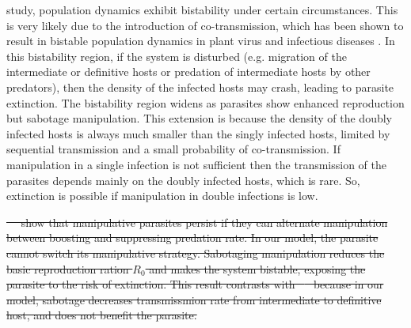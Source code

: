 \documentclass[a4paper]{scrartcl}
\providecommand{\DIFaddtex}[1]{{\protect\color{blue}\uwave{#1}}} %
\providecommand{\DIFdeltex}[1]{{\protect\color{red}\sout{#1}}}                      %
\providecommand{\DIFaddend}{} %
\providecommand{\DIFdelbegin}{} %
\providecommand{\DIFadd}[1]{\texorpdfstring{\DIFaddtex{#1}}{#1}} %
\providecommand{\DIFdel}[1]{\texorpdfstring{\DIFdeltex{#1}}{}} %
\newcommand{\DIFscaledelfig}{0.5}
\newlength{\DIFdelgraphicswidth} %
\newlength{\DIFdelgraphicsheight} %
\newcommand{\DIFdelincludegraphics}[2][]{%
\sbox{\DIFdelgraphicsbox}{\DIFOincludegraphics[#1]{#2}}%
\settoboxwidth{\DIFdelgraphicswidth}{\DIFdelgraphicsbox} %
\settoboxtotalheight{\DIFdelgraphicsheight}{\DIFdelgraphicsbox} %
\scalebox{\DIFscaledelfig}{%
\parbox[b]{\DIFdelgraphicswidth}{\usebox{\DIFdelgraphicsbox}\\[-\baselineskip] \rule{\DIFdelgraphicswidth}{0em}}\llap{\resizebox{\DIFdelgraphicswidth}{\DIFdelgraphicsheight}{%
\setlength{\unitlength}{\DIFdelgraphicswidth}%
\begin{picture}(1,1)%
\thicklines\linethickness{2pt} %
{\color[rgb]{1,0,0}\put(0,0){\framebox(1,1){}}}%
{\color[rgb]{1,0,0}\put(0,0){\line( 1,1){1}}}%
{\color[rgb]{1,0,0}\put(0,1){\line(1,-1){1}}}%
\end{picture}%
}\hspace*{3pt}}} %
} %
\DeclareRobustCommand{\DIFaddend}{\DIFOaddend \let\includegraphics\DIFOincludegraphics} %
\DeclareRobustCommand{\DIFdelbegin}{\DIFOdelbegin \let\includegraphics\DIFdelincludegraphics} %
\begin{document}
\DIFadd{In our }\DIFaddend study, population dynamics exhibit bistability under certain circumstances. 
This is very likely due to the introduction of co-transmission, which has been shown to result in bistable population dynamics in plant virus \cite{allen_modelling_2019} and infectious diseases \cite{gao_coinfection_2016-1}.
 In this bistability region, if the system is disturbed (e.g. migration of the intermediate or definitive hosts or predation of intermediate hosts by other predators), then the density of the infected hosts may crash, leading to parasite extinction. 
The bistability region widens as parasites show enhanced reproduction but sabotage manipulation. 
This extension is because the density of the doubly infected hosts is always much smaller than the singly infected hosts, limited by sequential transmission and a small probability of co-transmission. 
If manipulation in a single infection is not sufficient then the transmission of the parasites depends mainly on the doubly infected hosts, which is rare. 
So, extinction is possible if manipulation in double infections is low.

\DIFdelbegin \DIFdel{\mbox{%
\cite{Iritani2018} }\hskip0pt%
show that manipulative parasites persist if they can alternate manipulation between boosting and suppressing predation rate. 
In our model, the parasite cannot switch its manipulative strategy. 
Sabotaging manipulation reduces the basic reproduction ration $R_0$ and makes the system bistable, exposing the parasite to the risk of extinction. This result contrasts with \mbox{%
\cite{Iritani2018} }\hskip0pt%
because in our model, sabotage decreases transmissmion rate from intermediate to definitive host, and does not benefit the parasite.
}%
\end{document}
